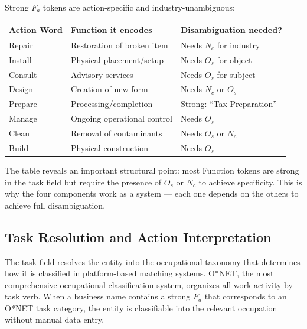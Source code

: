 \documentclass[12pt, openany]{book}
\theoremstyle{thmstyle}
\theoremstyle{defstyle}
\newcommand{\Nc}{N_c}
\newcommand{\Os}{O_s}
\newcommand{\Fa}{F_a}
\begin{document}
Strong $\Fa$ tokens are action-specific and industry-unambiguous:

\begin{center}
\begin{tabular}{lll}
\toprule
\textbf{Action Word} & \textbf{Function it encodes} & \textbf{Disambiguation needed?} \\
\midrule
Repair & Restoration of broken item & Needs $\Nc$ for industry \\
Install & Physical placement/setup & Needs $\Os$ for object \\
Consult & Advisory services & Needs $\Os$ for subject \\
Design & Creation of new form & Needs $\Nc$ or $\Os$ \\
Prepare & Processing/completion & Strong: ``Tax Preparation'' \\
Manage & Ongoing operational control & Needs $\Os$ \\
Clean & Removal of contaminants & Needs $\Os$ or $\Nc$ \\
Build & Physical construction & Needs $\Os$ \\
\bottomrule
\end{tabular}
\end{center}

The table reveals an important structural point: most Function tokens are strong in the task field but require the presence of $\Os$ or $\Nc$ to achieve specificity. This is why the four components work as a system --- each one depends on the others to achieve full disambiguation.

\subsection{Task Resolution and Action Interpretation}

The task field resolves the entity into the occupational taxonomy that determines how it is classified in platform-based matching systems. O*NET, the most comprehensive occupational classification system, organizes all work activity by task verb. When a business name contains a strong $\Fa$ that corresponds to an O*NET task category, the entity is classifiable into the relevant occupation without manual data entry.
\end{document}
